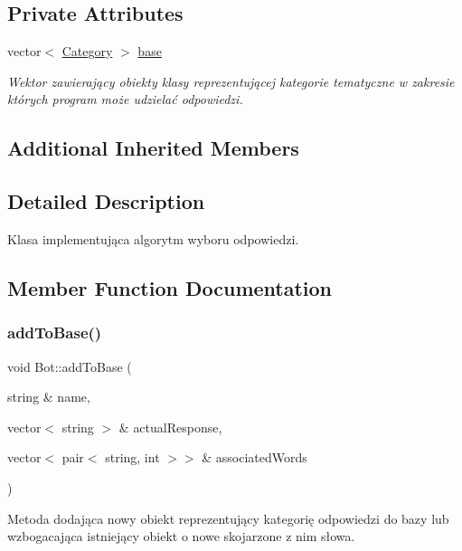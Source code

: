 \subsection*{Private Attributes}
\begin{DoxyCompactItemize}
\item 
\mbox{\label{class_bot_a41c4a9b18779ca2292580717ee0f5a0c}} 
vector$<$ \mbox{\hyperlink{class_category}{Category}} $>$ \mbox{\hyperlink{class_bot_a41c4a9b18779ca2292580717ee0f5a0c}{base}}
\begin{DoxyCompactList}\small\item\em Wektor zawierający obiekty klasy reprezentującej kategorie tematyczne w zakresie których program może udzielać odpowiedzi. \end{DoxyCompactList}\end{DoxyCompactItemize}
\subsection*{Additional Inherited Members}


\subsection{Detailed Description}
Klasa implementująca algorytm wyboru odpowiedzi. 

\subsection{Member Function Documentation}
\mbox{\label{class_bot_adc90e9f8e85c06332324ccf3fb851cca}} 
\subsubsection{\texorpdfstring{addToBase()}{addToBase()}}
{\footnotesize\ttfamily void Bot\+::add\+To\+Base (\begin{DoxyParamCaption}\item[{string \&}]{name,  }\item[{vector$<$ string $>$ \&}]{actual\+Response,  }\item[{vector$<$ pair$<$ string, int $>$$>$ \&}]{associated\+Words }\end{DoxyParamCaption})}



Metoda dodająca nowy obiekt reprezentujący kategorię odpowiedzi do bazy lub wzbogacająca istniejący obiekt o nowe skojarzone z nim słowa. 


